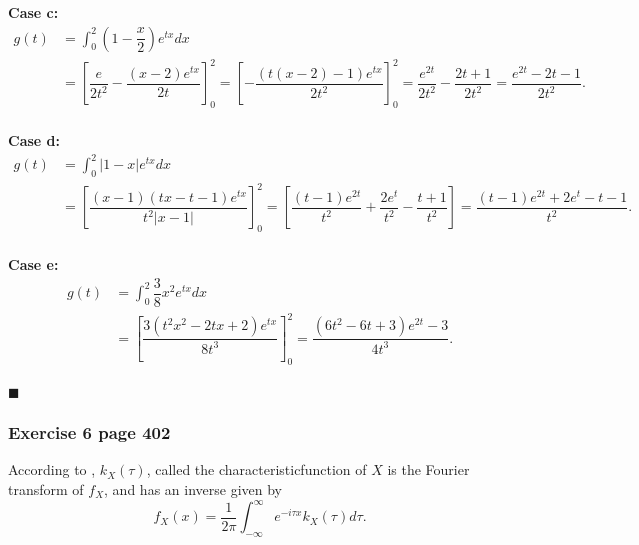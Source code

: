\documentclass[10pt,leter,openany]{article}
\begin{document}
		
				\textbf{Case c:} 	\begin{equation*}
				\begin{aligned}
					g(t) & = \int_{0}^{2} \left( 1- \dfrac{x}{2}\right) e^{tx} dx\\
					& = \left[ \dfrac{e}{2t^{2}} - \dfrac{(x-2)e^{ tx}}{2t}\right] ^{2}_{0} =  \left[   - \dfrac{(t(x-2)-1)e^{tx}}{2t^{2}} \right] ^{2}_{0} = \dfrac{e^{2t}}{2t^{2}}-\dfrac{2t+1}{2t^{2}} = \dfrac{e^{2t} - 2t - 1}{2t^{2}}.\\
				\end{aligned}	
				\end{equation*}
			
							\textbf{Case d:} 	\begin{equation*}
				\begin{aligned}
					g(t) & = \int_{0}^{2} \left| 1- x\right| e^{tx} dx\\
					& = \left[ \dfrac{(x-1)(tx-t-1)e^{tx}}{t^{2}| x -1 | } \right] ^{2}_{0} =  \left[  \dfrac{(t-1)e^{2t}}{t^{2}} + \dfrac{2e^{t}}{t^{2}} - \dfrac{t+1}{t^{2}}\right]  = \dfrac{(t-1)e^{2t} + 2e^{t} - t - 1}{t^{2}}.\\
				\end{aligned}	
			\end{equation*}
		
							\textbf{Case e:} 	\begin{equation*}
			\begin{aligned}
				g(t) & = \int_{0}^{2} \dfrac{3}{8}x^{2} e^{tx} dx\\
				& = \left[ \dfrac{3(t^{2}x^{2}-2tx+2)e^{tx}}{8t^{3} } \right] ^{2}_{0}  = \dfrac{(6t^{2}-6t+3)e^{2t} -3}{4t^{3}}.\\
			\end{aligned}	
			\end{equation*}
		
		
		
					\begin{flushright}
						$\blacksquare $ 
					\end{flushright}
		
		\subsubsection{Exercise 6 page 402}
		
			According to \citet{grinstead2012introduction}, $k_{X} (\tau)$, called the characteristicfunction of $ X $ is the Fourier transform of $f_{X}$, and has an inverse given by \begin{equation}
				f_{X}(x)  = \dfrac{1}{2\pi}\int_{-\infty}^{\infty} e^{-i\tau x} k_{X}(\tau)d\tau. 
			\end{equation}
		
\end{document}
